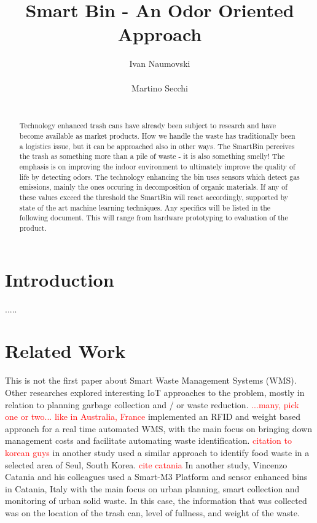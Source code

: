 \documentclass{sigchi}
\newcommand\todo[1]{\textcolor{red}{#1}}
\begin{document}
\title{Smart Bin - An Odor Oriented Approach}

\author{
  \alignauthor Ivan Naumovski\\
    \\
  \alignauthor Martino Secchi\\
    \\
}

\maketitle

\begin{abstract}
Technology enhanced trash cans have already been subject to research and have become available as market products.
How we handle the waste has traditionally been a logistics issue, but it can be approached also in other ways. The SmartBin perceives the trash as something more than a pile of waste - it is also something smelly!
The emphasis is on improving the indoor environment to ultimately improve the quality of life by detecting odors.
The technology enhancing the bin uses sensors which detect gas emissions, mainly the ones occuring in decomposition of organic materials.
If any of these values exceed the threshold the SmartBin will react accordingly, supported by state of the art machine learning techniques.
Any specifics will be listed in the following document. This will range from hardware prototyping to evaluation of the product.
\end{abstract}






\section{Introduction}
.....


\section{Related Work}

This is not the first paper about Smart Waste Management Systems (WMS).
Other researches explored interesting IoT approaches to the problem, mostly in relation to planning garbage collection and / or waste reduction.
\todo{...many, pick one or two... like in Australia, France} implemented an RFID and weight  based approach for a real time automated WMS, with the main focus on bringing down management costs and facilitate automating waste identification.
\todo{ citation to korean guys } in another study used a similar approach to identify food waste in a selected area of Seul, South Korea.
\todo{ cite catania} In another study, Vincenzo Catania and his colleagues used a Smart-M3 Platform and sensor enhanced bins in Catania, Italy with the main focus on urban planning, smart collection and  monitoring of urban solid waste. In this case, the information that was collected was on the location of the trash can, level of fullness, and weight of the waste.






\end{document}
